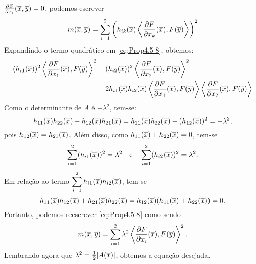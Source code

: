 \begin{demonstracao}
$\frac{\partial Z}{\partial x_i}(\overline{x},\overline{y})=0$, podemos escrever
\begin{eqnarray} \label{eq:Prop4.5-8}
m(\overline{x},\overline{y}) = \sum_{i=1}^2 \left( h_{ik}(\overline{x}) 
\left\langle \frac{\partial F}{\partial x_k}(\overline{x}), F(\overline{y}) \right\rangle \right)^2
\end{eqnarray}	
Expandindo o termo quadr\'atico em \eqref{eq:Prop4.5-8}, obtemos:
\begin{eqnarray*}
\begin{aligned}
(h_{i1}(\overline{x}))^2 \left\langle \frac{\partial F}{\partial x_1}(\overline{x}), F(\overline{y})\right\rangle^2 
&+ 
(h_{i2}(\overline{x}))^2 \left\langle \frac{\partial F}{\partial x_2}(\overline{x}),F(\overline{y})\right\rangle^2 \\
&+ 
2 h_{i1}(\overline{x}) h_{i2}(\overline{x}) \left\langle \frac{\partial F}
{\partial x_1}(\overline{x}), F(\overline{y}) \right\rangle \left\langle 
\frac{\partial F}{\partial x_2}(\overline{x}), F(\overline{y}) \right\rangle
\end{aligned}
\end{eqnarray*}	
Como o determinante de $A$ \'e $-\lambda^2$, tem-se:
\begin{equation*}
h_{11}(\overline{x}) h_{22}(\overline{x}) - h_{12}(\overline{x}) h_{21}(\overline{x}) = h_{11}(\overline{x}) h_{22}(\overline{x}) - (h_{12}(\overline{x}))^2 = -\lambda^2,
\end{equation*}	
pois $h_{12}(\overline{x}) = h_{21}(\overline{x})$. Al\'em disso, como 
$h_{11}(\overline{x}) + h_{22}(\overline{x}) = 0$, tem-se
\[
\sum_{i=1}^2 (h_{i1}(\overline{x}))^2 = \lambda^2 \quad\mbox{e}\quad
\sum_{i=1}^2 (h_{i2}(\overline{x}))^2 = \lambda^2.
\]
Em rela\c c\~ao ao termo $\displaystyle\sum_{i=1}^2 h_{i1}(\overline{x}) h_{i2}(\overline{x})$,
tem-se
\begin{equation*}
h_{11}(\overline{x}) h_{12}(\overline{x}) + h_{21}(\overline{x}) h_{22}(\overline{x}) = h_{12}(\overline{x}) (h_{11}(\overline{x}) + h_{22}(\overline{x})) = 0.
\end{equation*}	
Portanto, podemos reescrever \eqref{eq:Prop4.5-8} como sendo
\begin{equation*}
m(\overline{x},\overline{y}) = \sum_{i=1}^2 \lambda^2 \left\langle 
\frac{\partial F}{\partial x_i}(\overline{x}), F(\overline{y}) \right\rangle^2.
\end{equation*}	
Lembrando agora que $\lambda^2 = \frac{1}{2} |A(\overline{x})|$, obtemos
a equação desejada.
\end{demonstracao}


